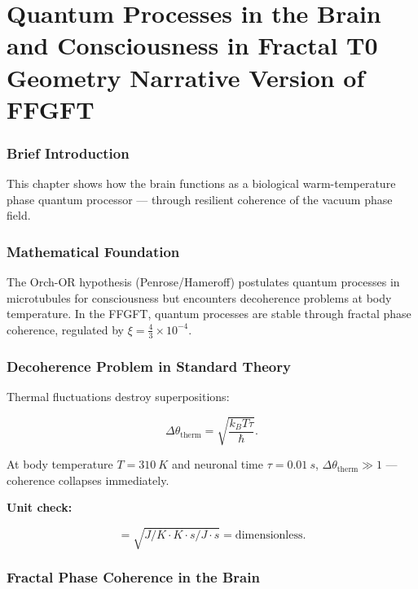 \chapter{Quantum Processes in the Brain and Consciousness in Fractal T0 Geometry  Narrative Version of FFGFT}


	
	\subsection*{Brief Introduction}
	
	This chapter shows how the brain functions as a biological warm-temperature phase quantum processor — through resilient coherence of the vacuum phase field.
	
	\subsection*{Mathematical Foundation}
	
	The Orch-OR hypothesis (Penrose/Hameroff) postulates quantum processes in microtubules for consciousness but encounters decoherence problems at body temperature. In the FFGFT, quantum processes are stable through fractal phase coherence, regulated by \(\xi = \frac{4}{3} \times 10^{-4}\).
	
	\subsection*{Decoherence Problem in Standard Theory}
	
	Thermal fluctuations destroy superpositions:
	
	\begin{equation}
		\Delta \theta_{\text{therm}} = \sqrt{\frac{k_B T \tau}{\hbar}}.
	\end{equation}
	
	At body temperature \(T = \SI{310}{K}\) and neuronal time \(\tau = \SI{0.01}{s}\), \(\Delta \theta_{\text{therm}} \gg 1\) — coherence collapses immediately.
	
	\textbf{Unit check:}
	
	\begin{equation}
		[\Delta \theta_{\text{therm}}] = \sqrt{\si{J/K} \cdot \si{K} \cdot \si{s} / \si{J \cdot s}} = \text{dimensionless}.
	\end{equation}
	
	\subsection*{Fractal Phase Coherence in the Brain}
	
